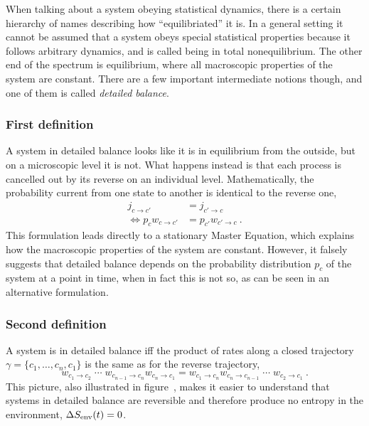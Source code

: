 When talking about a system obeying statistical dynamics, there is a certain hierarchy of names describing how ``equilibriated'' it is. In a general setting it cannot be assumed that a system obeys special statistical properties because it follows arbitrary dynamics, and is called being in total nonequilibrium. The other end of the spectrum is equilibrium, where all macroscopic properties of the system are constant. There are a few important intermediate notions though, and one of them is called \emph{detailed balance}.

\subsubsection{First definition}

A system in detailed balance looks like it is in equilibrium from the outside, but on a microscopic level it is not. What happens instead is that each process is cancelled out by its reverse on an individual level. Mathematically, the probability current from one state to another is identical to the reverse one,
%
\begin{equation}\begin{split}
	\label{eqn:db first def}
	j_{c\to c'} &= j_{c'\to c} \\
	\Leftrightarrow p_cw_{c\to c'} &= p_{c'}w_{c'\to c} ~.
\end{split}\end{equation}
%
This formulation leads directly to a stationary Master Equation, which explains how the macroscopic properties of the system are constant. However, it falsely suggests that detailed balance depends on the probability distribution \(p_c\) of the system at a point in time, when in fact this is not so, as can be seen in an alternative formulation.


\subsubsection{Second definition}

A system is in detailed balance iff the product of rates along a closed trajectory \(\gamma = \{c_1,\ldots,c_n,c_1\}\) is the same as for the reverse trajectory,
%
\begin{equation}
	w_{c_1\to c_2} \; \cdots \; w_{c_{n-1}\to c_n}w_{c_n\to c_1}
	=
	w_{c_1\to c_n}w_{c_n\to c_{n-1}} \; \cdots \; w_{c_2\to c_1} ~.
\end{equation}
%
This picture, also illustrated in figure~, makes it easier to understand that systems in detailed balance are reversible and therefore produce no entropy in the environment, \(\Delta S_\text{env}(t)=0\).

